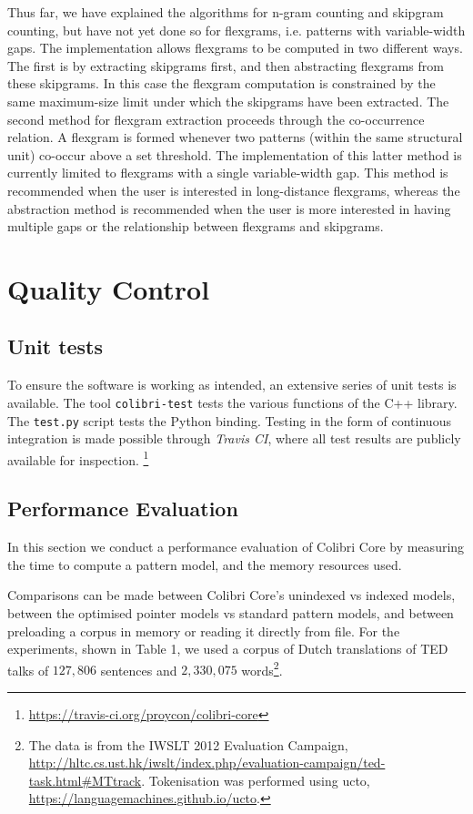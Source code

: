 Thus far, we have explained the algorithms for n-gram counting and skipgram
counting, but have not yet done so for flexgrams, i.e. patterns with
variable-width gaps. The implementation allows flexgrams to be computed in two
different ways. The first is by extracting skipgrams first, and then
abstracting flexgrams from these skipgrams. In this case the flexgram
computation is constrained by the same maximum-size limit under which the
skipgrams have been extracted.  The second method for flexgram extraction
proceeds through the co-occurrence relation. A flexgram is formed whenever two
patterns (within the same structural unit) co-occur above a set threshold. The
implementation of this latter method is currently limited to flexgrams with a
single variable-width gap. This method is recommended when the user is
interested in long-distance flexgrams, whereas the abstraction method is
recommended when the user is more interested in having multiple gaps or
the relationship between flexgrams and skipgrams.


\section{Quality Control}
\label{sec:qc}

\subsection*{Unit tests}

To ensure the software is working as intended, an extensive series of unit
tests is available.  The tool \texttt{colibri-test} tests the various functions
of the C++ library. The \texttt{test.py} script tests the Python binding.
Testing in the form of continuous integration is made possible through
\emph{Travis CI}, where all test results are publicly available for inspection.
\footnote{\url{https://travis-ci.org/proycon/colibri-core}}

\subsection*{Performance Evaluation}

In this section we conduct a performance evaluation of Colibri Core by
measuring the time to compute a pattern model, and the memory resources used.

Comparisons can be made between Colibri Core's
unindexed vs indexed models, between the optimised pointer models vs
standard pattern models, and between preloading a corpus in memory or reading
it directly from file.  For the experiments, shown in
Table 1, we used a corpus of Dutch
translations of TED talks of $127,806$ sentences and $2,330,075$
words\footnote{The data is from the IWSLT 2012 Evaluation Campaign,
    \url{http://hltc.cs.ust.hk/iwslt/index.php/evaluation-campaign/ted-task.html\#MTtrack}.
Tokenisation was performed using ucto,
\url{https://languagemachines.github.io/ucto}.}.

